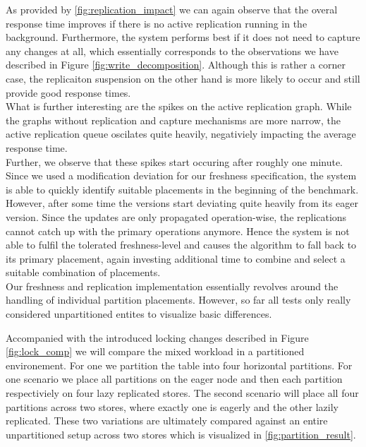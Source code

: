 As provided by \ref{fig:replication_impact} we can again observe that the overal response time improves if there is no active replication running in the background.
Furthermore, the system performs best if it does not need to capture any changes at all, 
which essentially corresponds to the observations we have described in Figure \ref{fig:write_decomposition}.
Although this is rather a corner case, the replicaiton suspension on the other hand is more likely to occur and still provide good response times.\\

What is further interesting are the spikes on the active replication graph. While the graphs without replication and capture mechanisms are more narrow,
the active replication queue oscilates quite heavily, negativiely impacting the average response time.\\
Further, we observe that these spikes start occuring after roughly one minute.
Since we used a modification deviation for our freshness specification, the system is able to quickly identify suitable placements in the beginning of the benchmark.
However, after some time the versions start deviating quite heavily from its eager version.
Since the updates are only propagated operation-wise, the replications cannot catch up with the primary operations anymore.
Hence the system is not able to fulfil the tolerated freshness-level and
causes the algorithm to fall back to its primary placement, again investing additional time to combine and select a suitable combination of placements.\\





Our freshness and replication implementation essentially revolves around the handling of individual partition placements.
However, so far all tests only really considered unpartitioned entites to visualize basic differences. 

Accompanied with the introduced locking changes described in Figure \ref{fig:lock_comp} we will compare the mixed workload in 
a partitioned environement. For one we partition the table into four horizontal partitions. 
For one scenario we place all partitions on the eager node and then each partition respectiviely on four lazy replicated stores.
The second scenario will place all four partitions across two stores, where exactly one is eagerly and the other lazily replicated. 
These two variations are ultimately compared against an entire unpartitioned setup across two stores which is visualized in \ref{fig:partition_result}.


